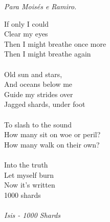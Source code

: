 \newpage

\vspace*{0.75\textheight}
\begin{flushright}
  \emph{Para Moisés e Ramiro.}
\end{flushright}

\newpage

\vspace*{0.2\textheight}
{\noindent 
If only I could \\
Clear my eyes \\
Then I might breathe once more \\
Then I might breathe again \\
\vspace{0.2 cm} \\
Old sun and stars, \\
And oceans below me \\
Guide my strides over \\
Jagged shards, under foot \\
\vspace{0.2 cm} \\
To slash to the sound \\
How many sit on woe or peril? \\
How many walk on their own? \\
\vspace{0.2 cm} \\
Into the truth \\
Let myself burn \\
Now it's written \\
1000 shards \\
\vspace{0.2 cm} \\
\emph {Isis - 1000 Shards}
}

